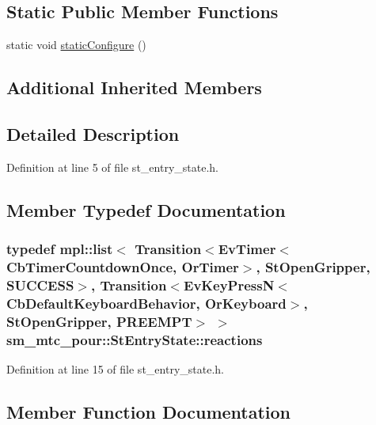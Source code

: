 \subsection*{Static Public Member Functions}
\begin{DoxyCompactItemize}
\item 
static void \hyperlink{structsm__mtc__pour_1_1StEntryState_a7b9beb758c81e33562a2b60aec6dc5ca}{static\+Configure} ()
\end{DoxyCompactItemize}
\subsection*{Additional Inherited Members}


\subsection{Detailed Description}


Definition at line 5 of file st\+\_\+entry\+\_\+state.\+h.



\subsection{Member Typedef Documentation}
\subsubsection[{\texorpdfstring{reactions}{reactions}}]{\setlength{\rightskip}{0pt plus 5cm}typedef mpl\+::list$<$ Transition$<$Ev\+Timer$<$Cb\+Timer\+Countdown\+Once, {\bf Or\+Timer}$>$, {\bf St\+Open\+Gripper}, {\bf S\+U\+C\+C\+E\+SS}$>$, Transition$<$Ev\+Key\+PressN$<$Cb\+Default\+Keyboard\+Behavior, {\bf Or\+Keyboard}$>$, {\bf St\+Open\+Gripper}, {\bf P\+R\+E\+E\+M\+PT}$>$ $>$ {\bf sm\+\_\+mtc\+\_\+pour\+::\+St\+Entry\+State\+::reactions}}\hypertarget{structsm__mtc__pour_1_1StEntryState_a8d996cedd27e47dbade59f1102d7bdb3}{}\label{structsm__mtc__pour_1_1StEntryState_a8d996cedd27e47dbade59f1102d7bdb3}


Definition at line 15 of file st\+\_\+entry\+\_\+state.\+h.



\subsection{Member Function Documentation}

